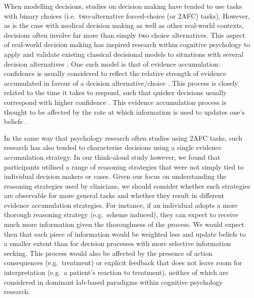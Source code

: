 \documentclass[a4paper, nobind]{templates/ociamthesis}
\begin{document}
When modelling decisions, studies on decision making have tended to use tasks with binary choices (i.e.~two-alternative forced-choice (or 2AFC) tasks). However, as is the case with medical decision making as well as other real-world contexts, decisions often involve far more than simply two choice alternatives. This aspect of real-world decision making has inspired research within cognitive psychology to apply and validate existing classical decisional models to situations with several decision alternatives \autocite{churchland2012,tajima2019,busemeyer2019,trueblood2022}. One such model is that of evidence accumulation: confidence is usually considered to reflect the relative strength of evidence accumulated in favour of a decision alternative/choice \autocite{vickers_effects_1982}. This process is closely related to the time it takes to respond, such that quicker decisions usually correspond with higher confidence \autocite{kiani_choice_2014}. This evidence accumulation process is thought to be affected by the rate at which information is used to updates one's beliefs \autocite{kloosterman_humans_2019}.

In the same way that psychology research often studies using 2AFC tasks, such research has also tended to characterise decisions using a single evidence accumulation strategy. In our think-aloud study however, we found that participants utilised a range of reasoning strategies that were not simply tied to individual decision makers or cases. Given our focus on understanding the reasoning strategies used by clinicians, we should consider whether such strategies are observable for more general tasks and whether they result in different evidence accumulation strategies. For instance, if an individual adopts a more thorough reasoning strategy (e.g.~scheme induced), they can expect to receive much more information given the thoroughness of the process. We would expect then that each piece of information would be weighted less and update beliefs to a smaller extent than for decision processes with more selective information seeking. This process would also be affected by the presence of action consequences (e.g.~treatment) or explicit feedback that does not leave room for interpretation (e.g.~a patient's reaction to treatment), neither of which are considered in dominant lab-based paradigms within cognitive psychology research.
\end{document}
